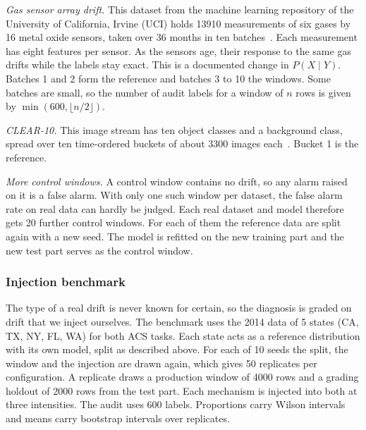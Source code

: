 \documentclass[pdflatex,referee,lineno,sn-basic]{sn-jnl}
\begin{document}
\emph{Gas sensor array drift.} This dataset from the machine learning repository of the University of California, Irvine (UCI) holds 13910 measurements of six gases by 16 metal oxide sensors, taken over 36 months in ten batches~\citep{vergara2012gas,rodriguezlujan2014gas}. Each measurement has eight features per sensor. As the sensors age, their response to the same gas drifts while the labels stay exact. This is a documented change in $P(X\mid Y)$. Batches 1 and 2 form the reference and batches 3 to 10 the windows. Some batches are small, so the number of audit labels for a window of $n$ rows is given by $\min(600,\lfloor n/2\rfloor)$.

\emph{CLEAR-10.} This image stream has ten object classes and a background class, spread over ten time-ordered buckets of about 3300 images each~\citep{lin2021clear}. Bucket 1 is the reference.

\emph{More control windows.} A control window contains no drift, so any alarm raised on it is a false alarm. With only one such window per dataset, the false alarm rate on real data can hardly be judged. Each real dataset and model therefore gets 20 further control windows. For each of them the reference data are split again with a new seed. The model is refitted on the new training part and the new test part serves as the control window.

\subsubsection{Injection benchmark}\label{sec:benchmark-setup}

The type of a real drift is never known for certain, so the diagnosis is graded on drift that we inject ourselves. The benchmark uses the 2014 data of 5 states (CA, TX, NY, FL, WA) for both ACS tasks. Each state acts as a reference distribution with its own model, split as described above. For each of 10 seeds the split, the window and the injection are drawn again, which gives 50 replicates per configuration. A replicate draws a production window of 4000 rows and a grading holdout of 2000 rows from the test part. Each mechanism is injected into both at three intensities. The audit uses 600 labels. Proportions carry Wilson intervals~\citep{wilson1927} and means carry bootstrap intervals over replicates.
\end{document}
